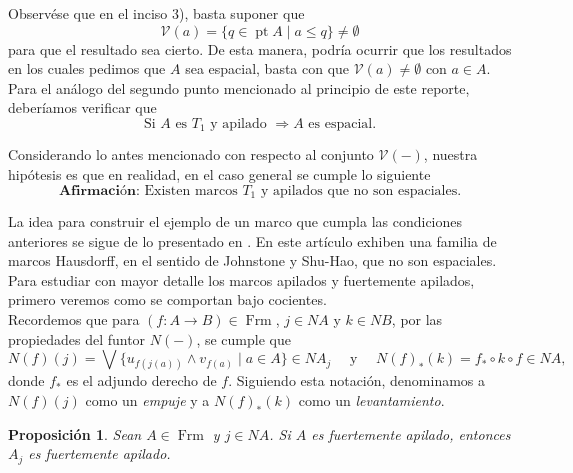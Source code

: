\documentclass[12pt]{article}
\newtheorem{prop}[thm]{Proposición}
\DeclareMathOperator{\Frm}{Frm}
\DeclareMathOperator{\pt}{pt}
\begin{document}
Observése que en el inciso 3), basta suponer que
\[
\mathcal{V}(a)=\{q\in \pt A\mid a\leq q\}\neq \emptyset
\]
para que el resultado sea cierto. De esta manera, podría ocurrir que los resultados en los cuales pedimos que $A$ sea espacial,
basta con que $\mathcal{V}(a)\neq \emptyset$ con $a\in A$.\\

Para el análogo del segundo punto mencionado al principio de este reporte, deberíamos verificar que
\[
\text{Si }A \text{ es }T_1 \text{ y apilado }\Rightarrow A \text{ es espacial}.
\]

Considerando lo antes mencionado con respecto al conjunto $\mathcal{V}(-)$, nuestra hipótesis es que en realidad, en el caso general se cumple lo siguiente
\[
\mathbf{\text{Afirmación:}} \text{ Existen marcos }T_1\text{ y apilados que no son espaciales.}
\]

La idea para construir el ejemplo de un marco que cumpla las condiciones anteriores se sigue de lo presentado en \cite{PasekaSmarda1992}. En este artículo exhiben una familia de marcos 
Hausdorff, en el sentido de Johnstone y Shu-Hao, que no son espaciales. Para estudiar con mayor detalle los marcos apilados y fuertemente apilados, primero veremos como se comportan bajo cocientes.\\

Recordemos que para $(f\colon A\to B)\in \Frm$, $j\in NA$ y $k\in NB$, por las propiedades del funtor $N(-)$, se cumple que
\[
N(f)(j)=\bigvee\{u_{f(j(a))}\wedge v_{f(a)}\mid a\in A\}\in NA_j\quad\text{ y }\quad N(f)_*(k)=f_*\circ k\circ f\in NA,
\]
donde $f_*$ es el adjundo derecho de $f$. Siguiendo esta notación, denominamos a $N(f)(j)$ como un \emph{empuje} y a $N(f)_*(k)$ como un \emph{levantamiento}. 

\begin{prop}
Sean $A\in \Frm$ y $j\in NA$. Si $A$ es fuertemente apilado, entonces $A_j$ es fuertemente apilado.
\end{prop}
\end{document}
